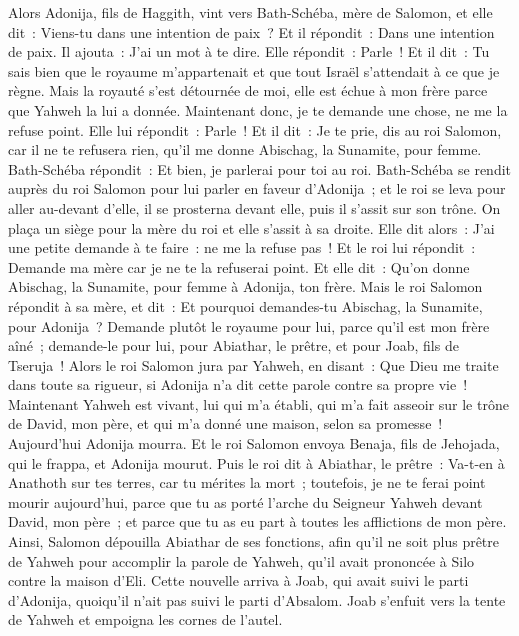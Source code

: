 \begin{multicols}{2}
Alors Adonija, fils de Haggith, vint vers Bath-Schéba, mère de Salomon, et elle dit~: Viens-tu dans une intention de paix~? Et il répondit~: Dans une intention de paix.
Il ajouta~: J'ai un mot à te dire. Elle répondit~: Parle~!
Et il dit~: Tu sais bien que le royaume m'appartenait et que tout Israël s'attendait à ce que je règne. Mais la royauté s'est détournée de moi, elle est échue à mon frère parce que Yahweh la lui a donnée.
Maintenant donc, je te demande une chose, ne me la refuse point. Elle lui répondit~: Parle~!
Et il dit~: Je te prie, dis au roi Salomon, car il ne te refusera rien, qu'il me donne Abischag, la Sunamite, pour femme.
Bath-Schéba répondit~: Et bien, je parlerai pour toi au roi.
Bath-Schéba se rendit auprès du roi Salomon pour lui parler en faveur d'Adonija~; et le roi se leva pour aller au-devant d'elle, il se prosterna devant elle, puis il s'assit sur son trône. On plaça un siège pour la mère du roi et elle s'assit à sa droite.
Elle dit alors~: J'ai une petite demande à te faire~: ne me la refuse pas~! Et le roi lui répondit~: Demande ma mère car je ne te la refuserai point.
Et elle dit~: Qu'on donne Abischag, la Sunamite, pour femme à Adonija, ton frère.
Mais le roi Salomon répondit à sa mère, et dit~: Et pourquoi demandes-tu Abischag, la Sunamite, pour Adonija~? Demande plutôt le royaume pour lui, parce qu'il est mon frère aîné~; demande-le pour lui, pour Abiathar, le prêtre, et pour Joab, fils de Tseruja~!
Alors le roi Salomon jura par Yahweh, en disant~: Que Dieu me traite dans toute sa rigueur, si Adonija n'a dit cette parole contre sa propre vie~!
Maintenant Yahweh est vivant, lui qui m'a établi, qui m'a fait asseoir sur le trône de David, mon père, et qui m'a donné une maison, selon sa promesse~! Aujourd'hui Adonija mourra.
Et le roi Salomon envoya Benaja, fils de Jehojada, qui le frappa, et Adonija mourut.
Puis le roi dit à Abiathar, le prêtre~: Va-t-en à Anathoth sur tes terres, car tu mérites la mort~; toutefois, je ne te ferai point mourir aujourd'hui, parce que tu as porté l'arche du Seigneur Yahweh devant David, mon père~; et parce que tu as eu part à toutes les afflictions de mon père.
Ainsi, Salomon dépouilla Abiathar de ses fonctions, afin qu'il ne soit plus prêtre de Yahweh pour accomplir la parole de Yahweh, qu'il avait prononcée à Silo contre la maison d'Eli.
Cette nouvelle arriva à Joab, qui avait suivi le parti d'Adonija, quoiqu'il n'ait pas suivi le parti d'Absalom. Joab s'enfuit vers la tente de Yahweh et empoigna les cornes de l'autel.

\end{multicols}
